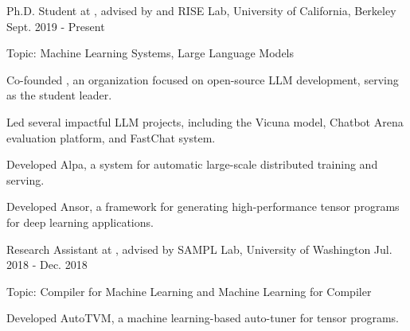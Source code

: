 

\begin{cventries}


\cventry
	{Ph.D. Student at , advised by 
     and
    } %
	{RISE Lab, University of California, Berkeley} %
	{Sept. 2019 - Present} %
	{} %
	{
		\begin{cvitems} %
			\item{Topic: Machine Learning Systems, Large Language Models}
			\item{Co-founded , an organization focused on open-source LLM development, serving as the student leader.}
			\item{Led several impactful LLM projects, including the Vicuna model, Chatbot Arena evaluation platform, and FastChat system.}
			\item{Developed Alpa, a system for automatic large-scale distributed training and serving.}
			\item{Developed Ansor, a framework for generating high-performance tensor programs for deep learning applications.}
		\end{cvitems}
	}


\cventry
	{Research Assistant at , advised by } %
	{SAMPL Lab, University of Washington} %
	{Jul. 2018 - Dec. 2018} %
	{} %
	{
		\begin{cvitems} %
			\item{Topic: Compiler for Machine Learning and Machine Learning for Compiler}
			\item{Developed AutoTVM, a machine learning-based auto-tuner for tensor programs.}
		\end{cvitems}
	}


\end{cventries}
